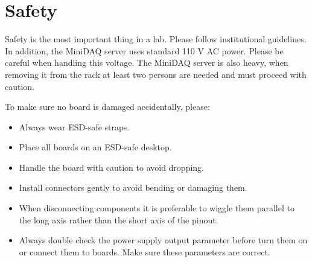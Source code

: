 \section{Safety}
Safety is the most important thing in a lab. Please follow institutional guidelines.
In addition, the MiniDAQ server uses standard 110 V AC power. Please be careful
when handling this voltage.
The MiniDAQ server is also heavy, when removing it from the rack at least two
persons are needed and must proceed with caution.

To make sure no board is damaged accidentally, please:
\begin{itemize}
    \item Always wear ESD-safe straps.
    \item Place all boards on an ESD-safe desktop.
    \item Handle the board with caution to avoid dropping.
    \item Install connectors gently to avoid bending or damaging them.
    \item When disconnecting components it is preferable to wiggle them parallel
        to the long axis rather than the short axis of the pinout.
    \item Always double check the power supply output parameter before turn them
        on or connect them to boards. Make sure these parameters are correct.
\end{itemize}

